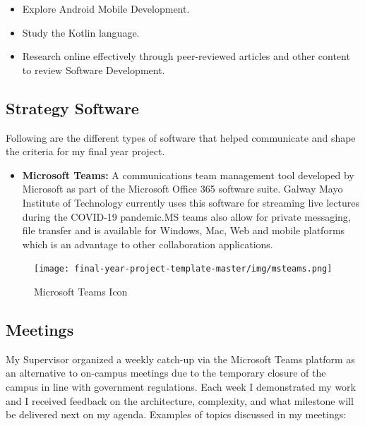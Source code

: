     \begin{itemize}
  \item  Explore Android Mobile Development. 
  \item  Study the Kotlin language.
  \item  Research online effectively through peer-reviewed articles and  other content  to review Software Development. 
\end{itemize}
    
    
    
            \subsection{ Strategy Software }
            Following  are the different types of software that helped communicate and shape the criteria for my final year project.


 \begin{itemize}
     \item \textbf{Microsoft Teams:} A communications team management tool developed by Microsoft as part of the Microsoft Office  365 software suite. Galway Mayo Institute of Technology currently uses this software for streaming live lectures during  the COVID-19 pandemic.MS teams also allow for private messaging, file transfer and is available for   Windows, Mac, Web and mobile platforms which is an advantage to other collaboration applications.

         \end{itemize}
         
          \begin{figure}[H]
  \centering
    \texttt{[image: final-year-project-template-master/img/msteams.png]}
     \caption{Microsoft Teams Icon }
\end{figure}

    
        \subsection{Meetings}
        My Supervisor organized a weekly catch-up via the Microsoft Teams platform as an alternative to on-campus meetings due to the temporary closure of the campus in line with government regulations. Each week I demonstrated my work and I received feedback on the architecture, complexity, and what milestone will be delivered next on my agenda. Examples of topics discussed in my meetings: 
        
